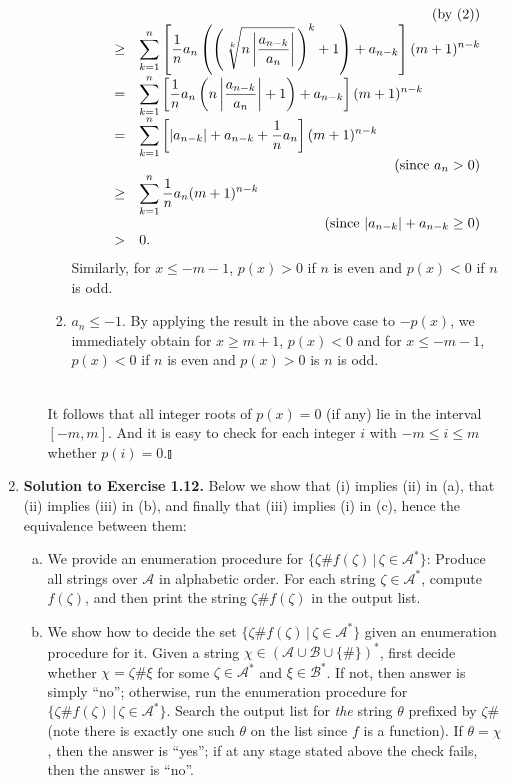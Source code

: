 \begin{enumerate}[1.]
\begin{enumerate}[(a)]
\begin{enumerate}[1)]
\[\begin{array}{lll}
\multicolumn{3}{r}{\mbox{(by (2))}} \cr
\    & \geq & \displaystyle\sum_{k = 1}^n \left[ \displaystyle\frac{1}{n} a_n \left(\left( \,\sqrt[k]{ n \left| \displaystyle\frac{a_{n - k}}{a_n} \right| }\, \right)^k + 1\right) + a_{n - k} \right] (m + 1)^{n - k} \cr
\    & = & \displaystyle\sum_{k = 1}^n \left[ \displaystyle\frac{1}{n} a_n \left( n \left| \displaystyle\frac{a_{n - k}}{a_n} \right| + 1\right) + a_{n - k} \right] (m + 1)^{n - k} \cr
\    & = & \displaystyle\sum_{k = 1}^n \left[ \left| a_{n - k} \right| + a_{n - k} + \displaystyle\frac{1}{n} a_n \right] (m + 1)^{n - k} \cr
\multicolumn{3}{r}{\mbox{(since $a_n > 0$)}} \cr
\    & \geq & \displaystyle\sum_{k = 1}^n \displaystyle\frac{1}{n} a_n (m + 1)^{n - k} \cr
\multicolumn{3}{r}{\mbox{(since $\left|a_{n - k}\right| + a_{n - k} \geq 0$)}} \cr
\ & > & 0.
\end{array}
\]
Similarly, for $x \leq -m - 1$, $p(x) > 0$ if $n$ is even and $p(x) < 0$ if $n$ is odd.
\item $a_n \leq -1$. By applying the result in the above case to $-p(x)$, we immediately obtain for $x \geq m + 1$, $p(x) < 0$ and for $x \leq -m - 1$, $p(x) < 0$ if $n$ is even and $p(x) > 0$ is $n$ is odd.
\end{enumerate}
\ \\
It follows that all integer roots of $p(x) = 0$ (if any) lie in the interval $[-m, m]$. And it is easy to check for each integer $i$ with $-m \leq i \leq m$ whether $p(i) = 0$.\nolinebreak\hfill$\talloblong$
\end{enumerate}
%
\item \textbf{Solution to Exercise 1.12.} Below we show that (i) implies (ii) in (a), that (ii) implies (iii) in (b), and finally that (iii) implies (i) in (c), hence the equivalence between them:
\begin{enumerate}[(a)]
\item We provide an enumeration procedure for $\{ \zeta\# f(\zeta) \,|\, \zeta \in \mathcal{A}^\ast \}$: Produce all strings over $\mathcal{A}$ in alphabetic order. For each string $\zeta \in \mathcal{A}^\ast$, compute $f(\zeta)$, and then print the string $\zeta\#f(\zeta)$ in the output list.
\item We show how to decide the set $\{ \zeta\#f(\zeta) \,|\, \zeta \in \mathcal{A}^\ast \}$ given an enumeration procedure for it. Given a string $\chi \in (\mathcal{A} \cup \mathcal{B} \cup \{ \# \})^\ast$, first decide whether $\chi = \zeta\#\xi$ for some $\zeta \in \mathcal{A}^\ast$ and $\xi \in \mathcal{B}^\ast$. If not, then answer is simply ``no''; otherwise, run the enumeration procedure for $\{ \zeta\#f(\zeta) \,|\, \zeta \in \mathcal{A}^\ast \}$. Search the output list for \emph{the} string $\theta$ prefixed by $\zeta\#$ (note there is exactly one such $\theta$ on the list since $f$ is a function). If $\theta = \chi$, then the answer is ``yes''; if at any stage stated above the check fails, then the answer is ``no''.

\end{enumerate}
\end{enumerate}
